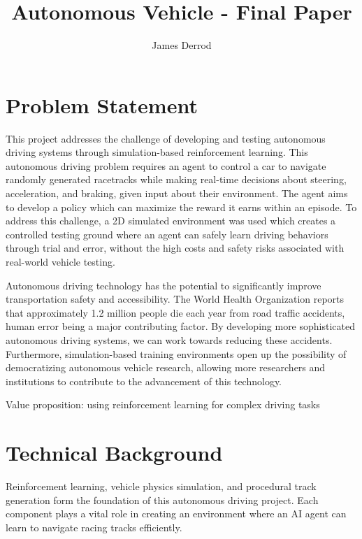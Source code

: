 \documentclass[10pt,twocolumn]{article}
\title{Autonomous Vehicle - Final Paper}
\author{James Derrod}
\affiliation{Occidental College}
\begin{document}
\maketitle

\section{Problem Statement}

This project addresses the challenge of developing and testing autonomous driving systems through simulation-based reinforcement learning. This autonomous driving problem requires an agent to control a car to navigate randomly generated racetracks while making real-time decisions about steering, acceleration, and braking, given input about their environment. The agent aims to develop a policy which can maximize the reward it earns within an episode. To address this challenge, a 2D simulated environment was used which creates a controlled testing ground where an agent can safely learn driving behaviors through trial and error, without the high costs and safety risks associated with real-world vehicle testing.
    
Autonomous driving technology has the potential to significantly improve transportation safety and accessibility. The World Health Organization reports that approximately 1.2 million people die each year from road traffic accidents\cite{WHORoadTraffic}, human error being a major contributing factor. By developing more sophisticated autonomous driving systems, we can work towards reducing these accidents. Furthermore, simulation-based training environments open up the possibility of democratizing autonomous vehicle research, allowing more researchers and institutions to contribute to the advancement of this technology.

Value proposition: using reinforcement learning for complex driving tasks


\section{Technical Background}
Reinforcement learning, vehicle physics simulation, and procedural track generation form the foundation of this autonomous driving project. Each component plays a vital role in creating an environment where an AI agent can learn to navigate racing tracks efficiently.
\end{document}
